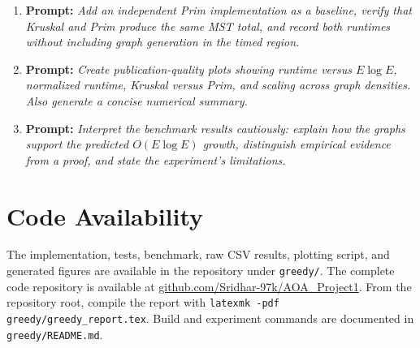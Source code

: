 \documentclass[conference]{IEEEtran}
\begin{document}
\begin{enumerate}
\item \textbf{Prompt:} \emph{Add an independent Prim implementation as a baseline, verify that Kruskal and Prim produce the same MST total, and record both runtimes without including graph generation in the timed region.}
\item \textbf{Prompt:} \emph{Create publication-quality plots showing runtime versus $E\log E$, normalized runtime, Kruskal versus Prim, and scaling across graph densities. Also generate a concise numerical summary.}
\item \textbf{Prompt:} \emph{Interpret the benchmark results cautiously: explain how the graphs support the predicted $O(E\log E)$ growth, distinguish empirical evidence from a proof, and state the experiment's limitations.}
\end{enumerate}

\section*{Code Availability}

The implementation, tests, benchmark, raw CSV results, plotting script, and
generated figures are available in the repository under \texttt{greedy/}.
The complete code repository is available at
\href{https://github.com/Sridhar-97k/AOA_Project1.git}{github.com/Sridhar-97k/AOA\_Project1}.
From the repository root, compile the report with
\texttt{latexmk -pdf greedy/greedy\_report.tex}. Build and experiment
commands are documented in \texttt{greedy/README.md}.
\end{document}
